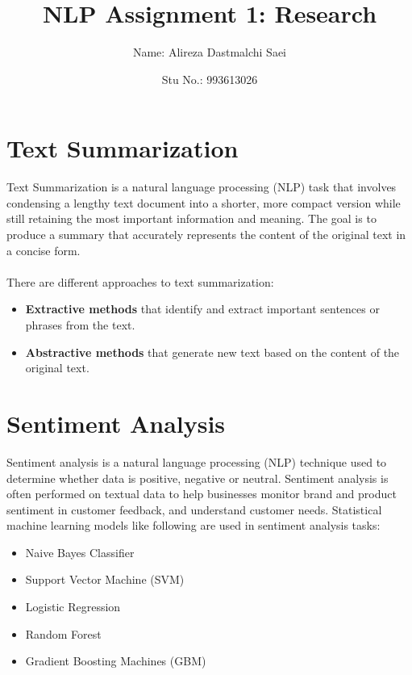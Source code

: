 \documentclass{article}
\title{\textbf{\Huge NLP Assignment 1: Research}}
\author{Name: Alireza Dastmalchi Saei}
\date{Stu No.: 993613026}
\begin{document}
\maketitle

\pagebreak

\section{Text Summarization}
Text Summarization is a natural language processing (NLP) task that involves condensing a lengthy text document into a shorter, more compact version while still retaining the most important information and meaning. The goal is to produce a summary that accurately represents the content of the original text in a concise form.\\\\
There are different approaches to text summarization:
\begin{itemize}
  \item \textbf{Extractive methods} that identify and extract important sentences or phrases from the text.
  \item \textbf{Abstractive methods} that generate new text based on the content of the original text.
\end{itemize}
\pagebreak

\section{Sentiment Analysis}
Sentiment analysis is a natural language processing (NLP) technique used to determine whether data is positive, negative or neutral. Sentiment analysis is often performed on textual data to help businesses monitor brand and product sentiment in customer feedback, and understand customer needs. Statistical machine learning models like following are used in sentiment analysis tasks:
\begin{itemize}
  \item Naive Bayes Classifier
  \item Support Vector Machine (SVM)
  \item Logistic Regression
  \item Random Forest
  \item Gradient Boosting Machines (GBM)
\end{itemize}

\pagebreak
\end{document}
